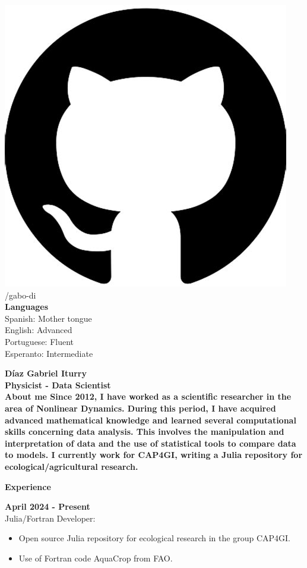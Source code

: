 \documentclass[a4paper,12pt,final]{memoir}
\newcommand{\Sep}{\vspace{1.5em}}
\newcommand{\SmallSep}{\vspace{0.5em}}
\newenvironment{AboutMe}
	{\ignorespaces\textbf{\color{RoyalBlue} About me}}
	{\Sep\ignorespacesafterend}
\newcommand{\CVSection}[1]
	{\Large\textbf{#1}\par
	\SmallSep\normalsize\normalfont}
\newcommand{\CVItem}[1]
	{\textbf{\color{RoyalBlue} #1}}
\begin{document}
\begin{flushleft}
    \vspace{1mm}
    \includegraphics[width=0.07\columnwidth]{git.jpeg} /gabo-di \\
    \vspace{1mm}
    \vspace{4mm}
	\textbf{Languages}\\
	\vspace{1mm}
	Spanish: Mother tongue\\
	\vspace{1mm}
	English: Advanced\\
	\vspace{1mm}
	Portuguese: Fluent\\
	\vspace{1mm}
	Esperanto: Intermediate
\end{flushleft}\normalsize


\framebreak



\Huge\bfseries {\color{RoyalBlue} D\'iaz Gabriel Iturry} \\
\Large\bfseries Physicist - Data Scientist\\

\normalsize\normalfont
\vspace{-10pt} 
\begin{AboutMe}
Since 2012, I have worked as a scientific researcher in the area of Nonlinear Dynamics. During this period, I have acquired advanced mathematical knowledge and learned several computational skills concerning data analysis. This involves the manipulation and interpretation of data and the use of statistical tools to compare data to models. I currently work for CAP4GI, writing a Julia repository for ecological/agricultural research.
\end{AboutMe}

\vspace{-15pt} 
\CVSection{Experience}

\CVItem{April 2024 - Present}\\
{\small Julia/Fortran Developer:}
\begin{footnotesize}
\begin{itemize}
\item Open source Julia repository for ecological research in the group CAP4GI.
\item Use of Fortran code AquaCrop from FAO.
\end{itemize}
\end{footnotesize}
\SmallSep
\end{document}

